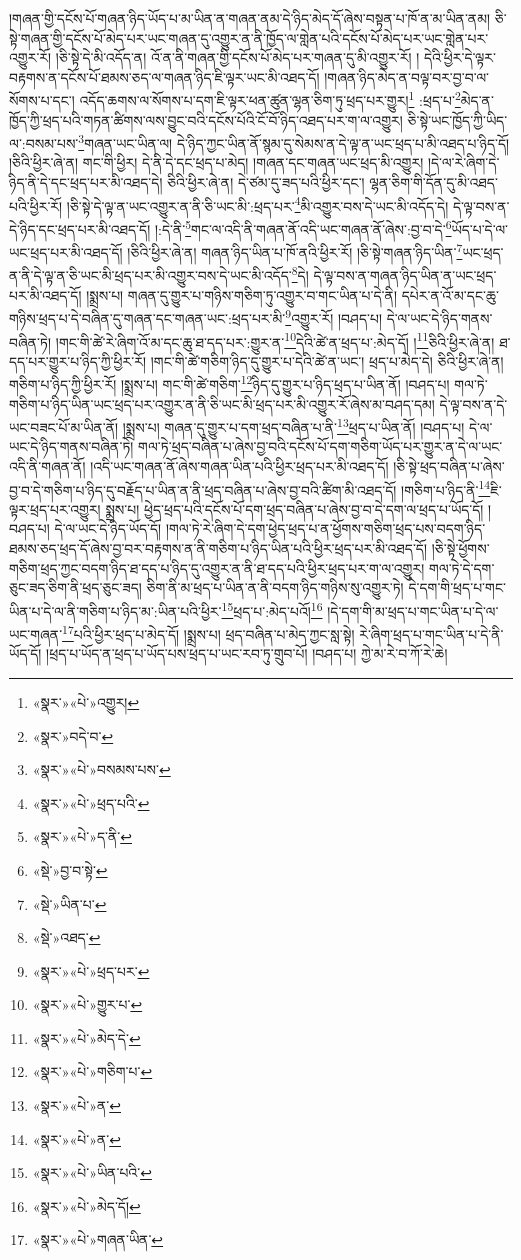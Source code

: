 །གཞན་གྱི་དངོས་པོ་གཞན་ཉིད་ཡོད་པ་མ་ཡིན་ན་གཞན་ནམ་དེ་ཉིད་མེད་དོ་ཞེས་བསྟན་པ་ཁོ་ན་མ་ཡིན་ནམ། ཅི་སྟེ་གཞན་གྱི་དངོས་པོ་མེད་པར་ཡང་གཞན་དུ་འགྱུར་ན་ནི་ཁྱོད་ལ་གླེན་པའི་དངོས་པོ་མེད་པར་ཡང་གླེན་པར་འགྱུར་རོ། །ཅི་སྟེ་དེ་མི་འདོད་ན། འོ་ན་ནི་གཞན་གྱི་དངོས་པོ་མེད་པར་གཞན་དུ་མི་འགྱུར་རོ། །
དེའི་ཕྱིར་དེ་ལྟར་བརྟགས་ན་དངོས་པོ་ཐམས་ཅད་ལ་གཞན་ཉིད་ཇི་ལྟར་ཡང་མི་འཐད་དོ། །གཞན་ཉིད་མེད་ན་བལྟ་བར་བྱ་བ་ལ་སོགས་པ་དང་། འདོད་ཆགས་ལ་སོགས་པ་དག་ཇི་ལྟར་ཕན་ཚུན་ལྷན་ཅིག་ཏུ་ཕྲད་པར་གྱུར།\footnote{«སྣར་»«པེ་»འགྱུར།} :ཕྲད་པ་\footnote{«སྣར་»བདེ་བ་}མེད་ན་ཁྱོད་ཀྱི་ཕྲད་པའི་གཏན་ཚིགས་ལས་བྱུང་བའི་དངོས་པོའི་ངོ་བོ་ཉིད་འཐད་པར་ག་ལ་འགྱུར། ཅི་སྟེ་ཡང་ཁྱོད་ཀྱི་ཡིད་ལ་:བསམ་པས་\footnote{«སྣར་»«པེ་»བསམས་པས་}གཞན་ཡང་ཡིན་ལ། དེ་ཉིད་ཀྱང་ཡིན་ནོ་སྙམ་དུ་སེམས་ན་དེ་ལྟ་ན་ཡང་ཕྲད་པ་མི་འཐད་པ་ཉིད་དོ། །ཅིའི་ཕྱིར་ཞེ་ན། གང་གི་ཕྱིར། དེ་ནི་དེ་དང་ཕྲད་པ་མེད། །གཞན་དང་གཞན་ཡང་ཕྲད་མི་འགྱུར། །དེ་ལ་རེ་ཞིག་དེ་ཉིད་ནི་དེ་དང་ཕྲད་པར་མི་འཐད་དེ། ཅིའི་ཕྱིར་ཞེ་ན། དེ་ཙམ་དུ་ཟད་པའི་ཕྱིར་དང་། ལྷན་ཅིག་གི་དོན་དུ་མི་འཐད་པའི་ཕྱིར་རོ། །ཅི་སྟེ་དེ་ལྟ་ན་ཡང་འགྱུར་ན་ནི་ཅི་ཡང་མི་:ཕྲད་པར་\footnote{«སྣར་»«པེ་»ཕྲད་པའི་}མི་འགྱུར་བས་དེ་ཡང་མི་འདོད་དེ། དེ་ལྟ་བས་ན་དེ་ཉིད་དང་ཕྲད་པར་མི་འཐད་དོ། །:དེ་ནི་\footnote{«སྣར་»«པེ་»ད་ནི་}གང་ལ་འདི་ནི་གཞན་ནོ་འདི་ཡང་གཞན་ནོ་ཞེས་:བྱ་བ་དེ་\footnote{«སྡེ་»བྱ་བ་སྟེ་}ཡོད་པ་དེ་ལ་ཡང་ཕྲད་པར་མི་འཐད་དོ། །ཅིའི་ཕྱིར་ཞེ་ན། གཞན་ཉིད་ཡིན་པ་ཁོ་ནའི་ཕྱིར་རོ། །ཅི་སྟེ་གཞན་ཉིད་ཡིན་\footnote{«སྡེ་»ཡིན་པ་}ཡང་ཕྲད་ན་ནི་དེ་ལྟ་ན་ཅི་ཡང་མི་ཕྲད་པར་མི་འགྱུར་བས་དེ་ཡང་མི་འདོད་\footnote{«སྡེ་»འཐད་}དེ། དེ་ལྟ་བས་ན་གཞན་ཉིད་ཡིན་ན་ཡང་ཕྲད་པར་མི་འཐད་དོ། །སྨྲས་པ། གཞན་དུ་གྱུར་པ་གཉིས་གཅིག་ཏུ་འགྱུར་བ་གང་ཡིན་པ་དེ་ནི། དཔེར་ན་འོ་མ་དང་ཆུ་གཉིས་ཕྲད་པ་དེ་བཞིན་དུ་གཞན་དང་གཞན་ཡང་:ཕྲད་པར་མི་\footnote{«སྣར་»«པེ་»ཕྲད་པར་}འགྱུར་རོ། །བཤད་པ། དེ་ལ་ཡང་དེ་ཉིད་གནས་བཞིན་ཏེ། །གང་གི་ཚེ་རེ་ཞིག་འོ་མ་དང་ཆུ་ཐ་དད་པར་:གྱུར་ན་\footnote{«སྣར་»«པེ་»གྱུར་པ་}དེའི་ཚེ་ན་ཕྲད་པ་:མེད་དོ། །\footnote{«སྣར་»«པེ་»མེད་དེ་}ཅིའི་ཕྱིར་ཞེ་ན། ཐ་དད་པར་གྱུར་པ་ཉིད་ཀྱི་ཕྱིར་རོ། །གང་གི་ཚེ་གཅིག་ཉིད་དུ་གྱུར་པ་དེའི་ཚེ་ན་ཡང་། ཕྲད་པ་མེད་དེ། ཅིའི་ཕྱིར་ཞེ་ན། གཅིག་པ་ཉིད་ཀྱི་ཕྱིར་རོ། །སྨྲས་པ། གང་གི་ཚེ་གཅིག་\footnote{«སྣར་»«པེ་»གཅིག་པ་}ཉིད་དུ་གྱུར་པ་ཉིད་ཕྲད་པ་ཡིན་ནོ། །བཤད་པ། གལ་ཏེ་གཅིག་པ་ཉིད་ཡིན་ཡང་ཕྲད་པར་འགྱུར་ན་ནི་ཅི་ཡང་མི་ཕྲད་པར་མི་འགྱུར་རོ་ཞེས་མ་བཤད་དམ། དེ་ལྟ་བས་ན་དེ་ཡང་བཟང་པོ་མ་ཡིན་ནོ། །སྨྲས་པ། གཞན་དུ་གྱུར་པ་དག་ཕྲད་བཞིན་པ་ནི་\footnote{«སྣར་»«པེ་»ན་}ཕྲད་པ་ཡིན་ནོ། །བཤད་པ། དེ་ལ་ཡང་དེ་ཉིད་གནས་བཞིན་ཏེ། གལ་ཏེ་ཕྲད་བཞིན་པ་ཞེས་བྱ་བའི་དངོས་པོ་དག་གཅིག་ཡོད་པར་གྱུར་ན་དེ་ལ་ཡང་འདི་ནི་གཞན་ནོ། །འདི་ཡང་གཞན་ནོ་ཞེས་གཞན་ཡིན་པའི་ཕྱིར་ཕྲད་པར་མི་འཐད་དོ། །ཅི་སྟེ་ཕྲད་བཞིན་པ་ཞེས་བྱ་བ་དེ་གཅིག་པ་ཉིད་དུ་བརྗོད་པ་ཡིན་ན་ནི་ཕྲད་བཞིན་པ་ཞེས་བྱ་བའི་ཚིག་མི་འཐད་དོ། །གཅིག་པ་ཉིད་ནི་\footnote{«སྣར་»«པེ་»ན་}ཇི་ལྟར་ཕྲད་པར་འགྱུར། སྨྲས་པ། ཕྱེད་ཕྲད་པའི་དངོས་པོ་དག་ཕྲད་བཞིན་པ་ཞེས་བྱ་བ་དེ་དག་ལ་ཕྲད་པ་ཡོད་དོ། །བཤད་པ། དེ་ལ་ཡང་དེ་ཉིད་ཡོད་དོ། །གལ་ཏེ་རེ་ཞིག་དེ་དག་ཕྱེད་ཕྲད་པ་ན་ཕྱོགས་གཅིག་ཕྲད་པས་བདག་ཉིད་ཐམས་ཅད་ཕྲད་དོ་ཞེས་བྱ་བར་བརྟགས་ན་ནི་གཅིག་པ་ཉིད་ཡིན་པའི་ཕྱིར་ཕྲད་པར་མི་འཐད་དོ། །ཅི་སྟེ་ཕྱོགས་གཅིག་ཕྲད་ཀྱང་བདག་ཉིད་ཐ་དད་པ་ཉིད་དུ་འགྱུར་ན་ནི་ཐ་དད་པའི་ཕྱིར་ཕྲད་པར་ག་ལ་འགྱུར། གལ་ཏེ་དེ་དག་ཅུང་ཟད་ཅིག་ནི་ཕྲད་ཅུང་ཟད། ཅིག་ནི་མ་ཕྲད་པ་ཡིན་ན་ནི་བདག་ཉིད་གཉིས་སུ་འགྱུར་ཏེ། དེ་དག་གི་ཕྲད་པ་གང་ཡིན་པ་དེ་ལ་ནི་གཅིག་པ་ཉིད་མ་:ཡིན་པའི་ཕྱིར་\footnote{«སྣར་»«པེ་»ཡིན་པའི་}ཕྲད་པ་:མེད་པའོ།\footnote{«སྣར་»«པེ་»མེད་དོ།} །དེ་དག་གི་མ་ཕྲད་པ་གང་ཡིན་པ་དེ་ལ་ཡང་གཞན་\footnote{«སྣར་»«པེ་»གཞན་ཡིན་}པའི་ཕྱིར་ཕྲད་པ་མེད་དོ། །སྨྲས་པ། ཕྲད་བཞིན་པ་མེད་ཀྱང་སླ་སྟེ། རེ་ཞིག་ཕྲད་པ་གང་ཡིན་པ་དེ་ནི་ཡོད་དོ། །ཕྲད་པ་ཡོད་ན་ཕྲད་པ་ཡོད་པས་ཕྲད་པ་ཡང་རབ་ཏུ་གྲུབ་པོ། །བཤད་པ། ཀྱེ་མ་རེ་བ་ཀོ་རེ་ཆེ། 